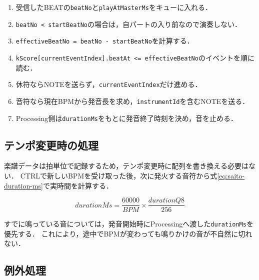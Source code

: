 \documentclass[uplatex,dvipdfmx]{jlreq}
\newcommand{\code}[1]{\texttt{#1}}
\begin{document}
\begin{enumerate}
  \item 受信したBEATの\code{beatNo}と\code{playAtMasterMs}をキューに入れる．
  \item \code{beatNo < startBeatNo}の場合は，自パートの入り前なので演奏しない．
  \item \code{effectiveBeatNo = beatNo - startBeatNo}を計算する．
  \item \code{kScore[currentEventIndex].beatAt <= effectiveBeatNo}のイベントを順に読む．
  \item 休符ならNOTEを送らず，\code{currentEventIndex}だけ進める．
  \item 音符なら現在BPMから発音長を求め，\code{instrumentId}を含むNOTEを送る．
  \item Processing側は\code{durationMs}をもとに発音終了時刻を決め，音を止める．
\end{enumerate}

\subsection{テンポ変更時の処理}

楽譜データは拍単位で記録するため，テンポ変更時に配列を書き換える必要はない．
CTRLで新しいBPMを受け取った後，次に発火する音符から式\ref{eq:saito-duration-ms}で実時間を計算する．

\begin{equation}
\label{eq:saito-duration-ms}
durationMs = \frac{60000}{BPM} \times \frac{durationQ8}{256}
\end{equation}

すでに鳴っている音については，発音開始時にProcessingへ渡した\code{durationMs}を優先する．
これにより，途中でBPMが変わっても鳴りかけの音が不自然に切れない．

\subsection{例外処理}
\end{document}
